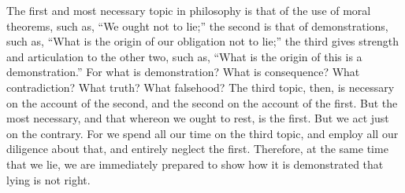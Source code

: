 The first and most necessary topic in philosophy is that of the
use of moral theorems, such as, ``We ought not to lie;'' the second
is that of demonstrations, such as, ``What is the origin of our obligation
not to lie;'' the third gives strength and articulation to the other
two, such as, ``What is the origin of this is a demonstration.'' For
what is demonstration? What is consequence? What contradiction? What
truth? What falsehood? The third topic, then, is necessary on the
account of the second, and the second on the account of the first.
But the most necessary, and that whereon we ought to rest, is the
first. But we act just on the contrary. For we spend all our time
on the third topic, and employ all our diligence about that, and entirely
neglect the first. Therefore, at the same time that we lie, we are
immediately prepared to show how it is demonstrated that lying is
not right. 
